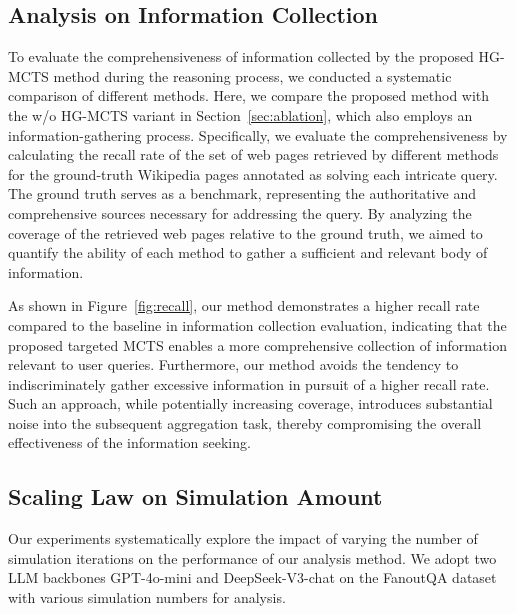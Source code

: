 \subsection{Analysis on Information Collection}
To evaluate the comprehensiveness of information collected by the proposed HG-MCTS method during the reasoning process, we conducted a systematic comparison of different methods. Here, we compare the proposed method with the w/o HG-MCTS variant in Section~\ref{sec:ablation}, which also employs an information-gathering process.
Specifically, we evaluate the comprehensiveness by calculating the recall rate of the set of web pages retrieved by different methods for the ground-truth Wikipedia pages annotated as solving each intricate query. 
The ground truth serves as a benchmark, representing the authoritative and comprehensive sources necessary for addressing the query. By analyzing the coverage of the retrieved web pages relative to the ground truth, we aimed to quantify the ability of each method to gather a sufficient and relevant body of information.

As shown in Figure~\ref{fig:recall}, our method demonstrates a higher recall rate compared to the baseline in information collection evaluation, indicating that the proposed targeted MCTS enables a more comprehensive collection of information relevant to user queries. Furthermore, our method avoids the tendency to indiscriminately gather excessive information in pursuit of a higher recall rate. Such an approach, while potentially increasing coverage, introduces substantial noise into the subsequent aggregation task, thereby compromising the overall effectiveness of the information seeking.


\subsection{Scaling Law on Simulation Amount}

Our experiments systematically explore the impact of varying the number of simulation iterations on the performance of our analysis method. We adopt two LLM backbones GPT-4o-mini and DeepSeek-V3-chat on the FanoutQA dataset with various simulation numbers for analysis. 

